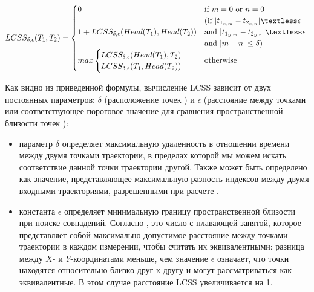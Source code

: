 \begin{equation} \label{eq:lcss}
	LCSS_{\delta, \epsilon}(T_1, T_2) = 
		\begin{cases}
			0 			&\text{if $m = 0$ or $n = 0$}\\
						&\text{(if $|t_{1_{x,m}} - t_{2_{x,n}}| \textless \epsilon$}\\
			1 + LCSS_{\delta, \epsilon}(Head(T_1), Head(T_2)) 
						&\text{and $|t_{1_{y,m}} - t_{2_{y,n}}| \textless \epsilon$ }\\
						&\text{and $|m - n| \le \delta$)}\\
			max
			\begin{cases}
				LCSS_{\delta, \epsilon}(Head(T_1), T_2)\\
				LCSS_{\delta, \epsilon}(T_1, Head(T_2))
			\end{cases} &\text{otherwise}
		\end{cases}
\end{equation}

Как видно из приведенной формулы, вычисление LCSS зависит от двух постоянных параметров: $\delta$ (расположение точек \cite{online:r_lcss}) и $\epsilon$ (расстояние между точками \cite{online:r_lcss} или соответствующее пороговое значение для сравнения пространственной близости точек \cite{article:tr_sim_meas}):
 
\begin{itemize}
	\setlength\itemsep{-0.5em}
	\item параметр $\delta$ определяет максимальную удаленность в отношении времени между двумя точками траектории, в пределах которой мы можем искать соответствие данной точки траектории другой. Также может быть определено как значение, представляющее максимальную разность индексов между двумя входными траекториями, разрешенными при расчете \cite{online:r_lcss}.
	\item константа $\epsilon$ определяет минимальную границу пространственной близости при поиске совпадений. Согласно \cite{online:r_lcss}, это число с плавающей запятой, которое представляет собой максимально допустимое расстояние между точками траектории в каждом измерении, чтобы считать их эквивалентными: разница между $X$- и $Y$-координатами меньше, чем значение $\epsilon$ означает, что точки находятся относительно близко друг к другу и могут рассматриваться как эквивалентные. В этом случае расстояние LCSS увеличивается на 1.
\end{itemize}

